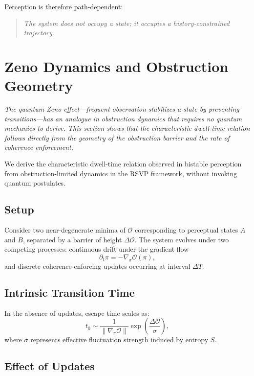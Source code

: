 \documentclass[12pt,a4paper]{article}
\begin{document}
Perception is therefore path-dependent:
\begin{quote}
\emph{The system does not occupy a state; it occupies a history-constrained trajectory.}
\end{quote}

\section{Zeno Dynamics and Obstruction Geometry}
\label{sec:zeno}

\textit{The quantum Zeno effect---frequent observation stabilizes a state by preventing transitions---has an analogue in obstruction dynamics that requires no quantum mechanics to derive. This section shows that the characteristic dwell-time relation follows directly from the geometry of the obstruction barrier and the rate of coherence enforcement.}

We derive the characteristic dwell-time relation observed in bistable perception from obstruction-limited dynamics in the RSVP framework, without invoking quantum postulates.

\subsection{Setup}

Consider two near-degenerate minima of $\mathcal{O}$ corresponding to perceptual states $A$ and $B$, separated by a barrier of height $\Delta\mathcal{O}$. The system evolves under two competing processes: continuous drift under the gradient flow
\[
\partial_t \pi = -\nabla_\pi \mathcal{O}(\pi),
\]
and discrete coherence-enforcing updates occurring at interval $\Delta T$.

\subsection{Intrinsic Transition Time}

In the absence of updates, escape time scales as:
\[
t_0 \sim \frac{1}{\|\nabla_\pi \mathcal{O}\|} \exp\!\left(\frac{\Delta \mathcal{O}}{\sigma}\right),
\]
where $\sigma$ represents effective fluctuation strength induced by entropy $S$.

\subsection{Effect of Updates}
\end{document}

